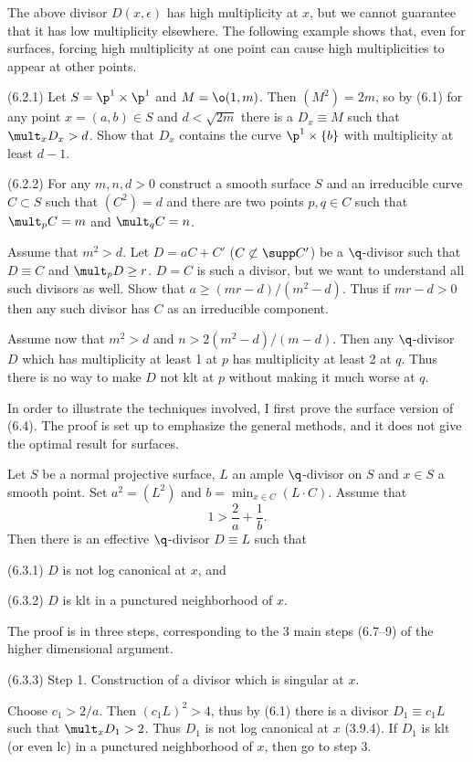 The above divisor $D(x,\epsilon)$ has high multiplicity at $x$, but we cannot
guarantee that it has low multiplicity elsewhere. The following example shows
that, even for surfaces, forcing high multiplicity at one point can cause high
multiplicities to appear at other points. 


 (6.2.1) Let $S=\p^1\times \p^1$ and $M=\o(1,m)$. Then
$(M^2)=2m$, so by (6.1) for  any point $x=(a,b)\in S$ and $d<\sqrt{2m}$ there
is a
$D_x\equiv M$ such that $\mult_xD_x>d$. Show that $D_x$ contains the curve 
$\p^1\times
\{b\}$ with multiplicity at least $d-1$. 


(6.2.2) For any $m,n, d>0$ construct a smooth surface $S$  and
an irreducible curve
$C\subset S$  such that $(C^2)=d$ and there are two points $p,q\in C$ such
that $\mult_pC=m$ and $\mult_qC=n$.

Assume that $m^2>d$. 
Let $D=aC+C'$ ($C\not\subset \supp C'$) be a $\q$-divisor such that $D\equiv C$
and
$\mult_pD\geq r$.  $D=C$ is such a divisor, but we want to understand all such
divisors as well.
 Show that $a\geq
(mr-d)/(m^2-d)$.  Thus if $mr-d>0$ then any such divisor has $C$ as an
irreducible component.


Assume now that $m^2>d$ and
$n>2(m^2-d)/(m-d)$. Then any   $\q$-divisor $D$ which has multiplicity at
least 1 at $p$ has multiplicity at least 2 at $q$. Thus there is no way to
make $D$ not klt at $p$ without making it much worse at $q$.
\enddemo

In order to illustrate the techniques involved, I first prove the surface
version of (6.4). The proof is set up to emphasize the general methods, and 
it does not give the optimal  result for surfaces.

 Let $S$ be a normal projective surface, $L$ an
ample
 $\q$-divisor on $S$ and $x\in S$ a smooth point.  Set
$a^2=(L^2)$ and $b=\min_{x\in C} (L\cdot C)$.
Assume that
$$
1> \frac2{a}+\frac1{b}.
$$
Then there is an effective $\q$-divisor $D\equiv L$ such that

(6.3.1) $D$ is not log canonical at $x$, and

(6.3.2) $D$ is klt in a punctured neighborhood of $x$.
\endproclaim

\demop   The proof is in three steps, corresponding to the 3 main steps
(6.7--9) of the higher dimensional  argument.

(6.3.3) Step 1.  Construction of a divisor which is singular at $x$.

Choose $c_1>2/a$. Then $(c_1L)^2>4$, thus by (6.1) there is a divisor
$D_1\equiv c_1L$ such that $\mult_xD_1>2$. Thus $D_1$ is not log
canonical at
$x$ (3.9.4).
If $D_1$ is klt (or even lc) in a punctured neighborhood of $x$, then  go to
step 3.

